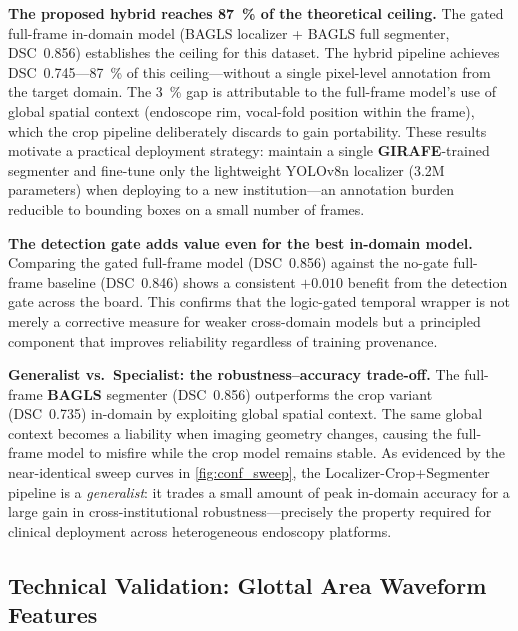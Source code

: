 \documentclass[preprint,12pt]{elsarticle}
\newcommand{\girafe}{\textbf{GIRAFE}}
\newcommand{\bagls}{\textbf{BAGLS}}
\newcommand{\yolocrop}{Localizer-Crop+Segmenter}
\begin{document}
\textbf{The proposed hybrid reaches \SI{87}{\%} of the theoretical ceiling.}
The gated full-frame in-domain model (BAGLS localizer + BAGLS full segmenter,
DSC~\num{0.856}) establishes the ceiling for this dataset.
The hybrid pipeline achieves DSC~\num{0.745}---\SI{87}{\%} of this
ceiling---without a single pixel-level annotation from the target domain.
The \SI{3}{\%} gap is attributable to the full-frame model's use of global
spatial context (endoscope rim, vocal-fold position within the frame), which
the crop pipeline deliberately discards to gain portability.
These results motivate a practical deployment strategy: maintain a single
\girafe{}-trained segmenter and fine-tune only the lightweight YOLOv8n
localizer (\num{3.2}M parameters) when deploying to a new institution---an
annotation burden reducible to bounding boxes on a small number of frames.

\textbf{The detection gate adds value even for the best in-domain model.}
Comparing the gated full-frame model (DSC~\num{0.856}) against the
no-gate full-frame baseline (DSC~\num{0.846}) shows a consistent
$+0.010$ benefit from the detection gate across the board.
This confirms that the logic-gated temporal wrapper is not merely a
corrective measure for weaker cross-domain models but a principled
component that improves reliability regardless of training provenance.

\textbf{Generalist vs.\ Specialist: the robustness--accuracy trade-off.}
The full-frame \bagls{} segmenter (DSC~\num{0.856}) outperforms the crop
variant (DSC~\num{0.735}) in-domain by exploiting global spatial context.
The same global context becomes a liability when imaging geometry changes,
causing the full-frame model to misfire while the crop model remains stable.
As evidenced by the near-identical sweep curves in \cref{fig:conf_sweep},
the \yolocrop{} pipeline is a \emph{generalist}: it trades a small amount
of peak in-domain accuracy for a large gain in cross-institutional
robustness---precisely the property required for clinical deployment
across heterogeneous endoscopy platforms.

\subsection{Technical Validation: Glottal Area Waveform Features}
\label{sec:results_gaw}
\end{document}
